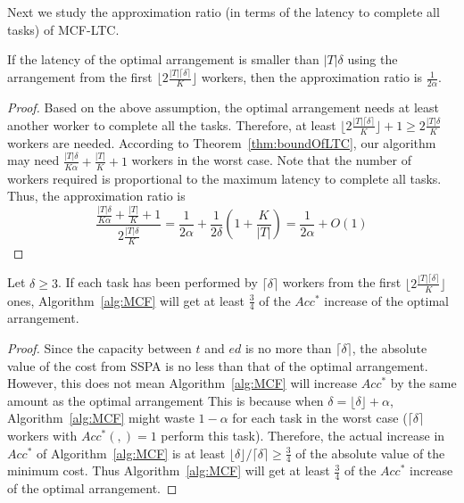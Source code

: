 Next we study the approximation ratio (in terms of the latency to complete all tasks) of MCF-LTC.

\begin{lemma}
\label{lem:ratioNotFinish}
If the latency of the optimal arrangement is smaller than $|T|\delta$ using the arrangement from the first $\lfloor 2\frac{|T|\lceil \delta \rceil}{K} \rfloor$ workers,
then the approximation ratio is $\frac{1}{2\alpha}$.
\end{lemma}
\begin{proof}
Based on the above assumption, the optimal arrangement needs at least another worker to complete all the tasks.
Therefore, at least $\lfloor 2\frac{|T|\lceil \delta \rceil}{K} \rfloor + 1 \ge 2\frac{|T|\delta}{K}$ workers are needed.
According to Theorem~\ref{thm:boundOfLTC}, our algorithm may need $\frac{|T|\delta}{K\alpha} + \frac{|T|}{K} + 1$ workers in the worst case.
Note that the number of workers required is proportional to the maximum latency to complete all tasks.
Thus, the approximation ratio is
\begin{equation*}
	\frac{\frac{|T|\delta}{K\alpha} + \frac{|T|}{K} + 1}{2\frac{|T|\delta}{K}} = \frac{1}{2\alpha} + \frac{1}{2\delta}(1+\frac{K}{|T|})  = \frac{1}{2\alpha} + O(1)
\end{equation*}
\end{proof}

\begin{lemma}
\label{lem:functionOfMCF}
Let $\delta \ge 3$.
If each task has been performed by $\lceil \delta \rceil$ workers from the first $\lfloor 2\frac{|T|\lceil \delta \rceil}{K} \rfloor$ ones,
Algorithm~\ref{alg:MCF} will get at least $\frac{3}{4}$ of the $Acc^{*}$ increase of the optimal arrangement.
\end{lemma}
\begin{proof}
Since the capacity between $t$ and $ed$ is no more than $\lceil \delta \rceil$, the absolute value of the cost from SSPA is no less than that of the optimal arrangement.
However, this does not mean Algorithm~\ref{alg:MCF} will increase $Acc^{*}$ by the same amount as the optimal arrangement
This is because when $\delta = \lfloor \delta \rfloor + \alpha$, Algorithm~\ref{alg:MCF} might waste $1 - \alpha$ for each task in the worst case
(\eg $\lceil \delta \rceil$ workers with $Acc^{*}(,) = 1$ perform this task).
Therefore, the actual increase in $Acc^*$ of Algorithm~\ref{alg:MCF} is at least $\lfloor \delta \rfloor / \lceil \delta \rceil \ge \frac{3}{4}$ of the absolute value of the minimum cost.
Thus Algorithm~\ref{alg:MCF} will get at least $\frac{3}{4}$ of the $Acc^{*}$ increase of the optimal arrangement.
\end{proof}

